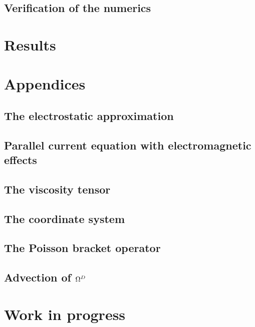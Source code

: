 \documentclass[12pt,a4paper,oneside,openright]{report} %
\begin{document}
\chapter{Verification of the numerics}
\label{app:verification}


\part{Results}

\part{Appendices}
\appendix

\chapter{The electrostatic approximation}
\label{app:elstat}


\chapter{Parallel current equation with electromagnetic effects}
\label{app:elmag}


\chapter{The viscosity tensor}
\label{app:piTensor}


\chapter{The coordinate system}
\label{app:coord}


\chapter{The Poisson bracket operator}
\label{app:poisson}


\chapter{Advection of \texorpdfstring{$\Omega^D$}{OmegaD}}
\label{app:vortDAdv}


\part{Work in progress}
\end{document}
